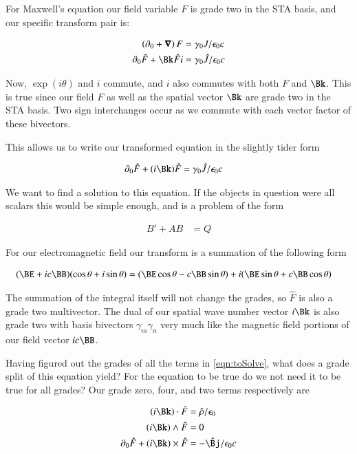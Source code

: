 \documentclass{article}
\begin{document}
For Maxwell's equation our field variable $F$ is grade two in the STA basis, and our specific transform pair is:

\begin{align}
\left(\partial_0 + \spacegrad \right) F &= \gamma_0 J/\epsilon_0 c \\
\partial_0 \hat{F} + \Bk \hat{F} i &= \gamma_0 \hat{J}/ \epsilon_0 c
\end{align}

Now, $\exp(i\theta)$ and $i$ commute, and $i$ also commutes with both $F$ and $\Bk$.  This is true since our field $F$ as well as the spatial vector $\Bk$ are grade two in the STA basis.  
Two sign interchanges occur as we commute with each vector factor of these
bivectors.

This allows us to write our transformed equation in the slightly tider form

\begin{align}\label{eqn:toSolve}
\partial_0 \hat{F} + (i \Bk) \hat{F} &= \gamma_0 \hat{J}/ \epsilon_0 c
\end{align}

We want to find a solution to this equation.  If the objects in question were all scalars this would be simple enough, and is a problem of the form

\begin{align}\label{eqn:firstOrder}
B' + A B &= Q
\end{align}

For our electromagnetic field our transform is a summation of the following 
form

\begin{align*}
(\BE + i c \BB) (\cos\theta + i \sin\theta)
&=
(\BE \cos\theta - c \BB \sin\theta) + 
i (\BE \sin\theta + c \BB \cos\theta)
\end{align*}

The summation of the integral itself will not change the grades, so $\hat{F}$
is also a grade two multivector.  The dual of our spatial wave number
vector $i\Bk$ is also grade two with basis bivectors $\gamma_m \gamma_n$ very 
much like the magnetic field portions of our field vector $i c \BB$.

Having figured out the grades of all the terms in \ref{eqn:toSolve}, what
does a grade split of this equation yield?  For the equation to be true
do we not need it to be true for all grades?  Our grade zero, four, and two
terms respectively are

\begin{align*}
(i \Bk) \cdot \hat{F} &= \hat{\rho}/ \epsilon_0 \\
(i \Bk) \wedge \hat{F} &= 0 \\
\partial_0 \hat{F} + (i \Bk) \times \hat{F} &= -\hat{\Bj}/ \epsilon_0 c
\end{align*}
\end{document}
